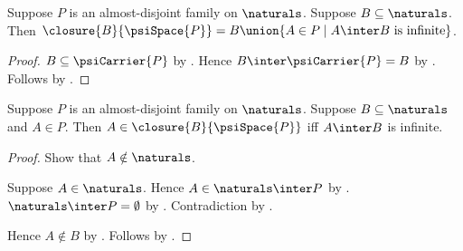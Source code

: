 \begin{corollary}\label{psi_closure_of_natural_subset}
    Suppose $P$ is an almost-disjoint family on $\naturals$.
    Suppose $B\subseteq\naturals$.
    Then
        $\closure{B}{\psiSpace{P}}=
        B\union\{A\in P\mid \text{$A\inter B$ is infinite}\}$.
\end{corollary}
\begin{proof}
    $B\subseteq\psiCarrier{P}$ by
        .
    Hence $B\inter\psiCarrier{P}=B$
        by .
    Follows by .
\end{proof}

\begin{corollary}\label{psi_family_point_in_closure_iff}
    Suppose $P$ is an almost-disjoint family on $\naturals$.
    Suppose $B\subseteq\naturals$ and $A\in P$.
    Then $A\in\closure{B}{\psiSpace{P}}$ iff
        $A\inter B$ is infinite.
\end{corollary}
\begin{proof}
    Show that $A\notin\naturals$.
    \begin{subproof}
        Suppose $A\in\naturals$.
        Hence $A\in\naturals\inter P$ by .
        $\naturals\inter P=\emptyset$ by
            .
        Contradiction by .
    \end{subproof}
    Hence $A\notin B$ by .
    Follows by .
\end{proof}

